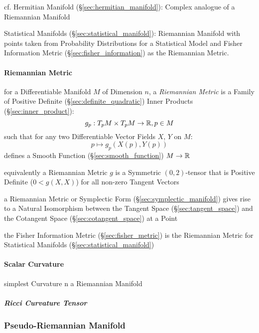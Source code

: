 cf. Hermitian Manifold (\S\ref{sec:hermitian_manifold}): Complex
analogue of a Riemannian Manifold

\fist Statistical Manifolds (\S\ref{sec:statistical_manifold}):
Riemannian Manifold with points taken from Probability Distributions
for a Statistical Model and Fisher Information Metric
(\S\ref{sec:fisher_information}) as the Riemannian Metric.



\paragraph{Riemannian Metric}\label{sec:riemannian_metric}\hfill

for a Differentiable Manifold $M$ of Dimension $n$, a \emph{Riemannian
  Metric} is a Family of Positive Definite
(\S\ref{sec:definite_quadratic}) Inner Products
(\S\ref{sec:inner_product}):
\[
  g_p : T_p M \times T_p M \rightarrow \mathbb{R}, p \in M
\]
such that for any two Differentiable Vector Fields $X$, $Y$ on $M$:
\[
  p \mapsto g_p (X(p), Y(p))
\]
defines a Smooth Function (\S\ref{sec:smooth_function}) $M \rightarrow
\mathbb{R}$

equivalently a Riemannian Metric $g$ is a Symmetric $(0,2)$-tensor
that is Positive Definite ($0 < g(X,X)$) for all non-zero Tangent
Vectors %

a Riemannian Metric or Symplectic Form (\S\ref{sec:symplectic_manifold}) gives
rise to a Natural Isomorphism between the Tangent Space
(\S\ref{sec:tangent_space}) and the Cotangent Space
(\S\ref{sec:cotangent_space}) at a Point

the Fisher Information Metric (\S\ref{sec:fisher_metric}) is the Riemannian
Metric for Statistical Manifolds (\S\ref{sec:statistical_manifold})



\paragraph{Scalar Curvature}\label{sec:scalar_curvature}\hfill

simplest Curvature n a Riemannian Manifold



\subparagraph{Ricci Curvature Tensor}\label{sec:ricci_curvature}\hfill



\subsubsection{Pseudo-Riemannian Manifold}
\label{sec:pseudo_riemannian}

